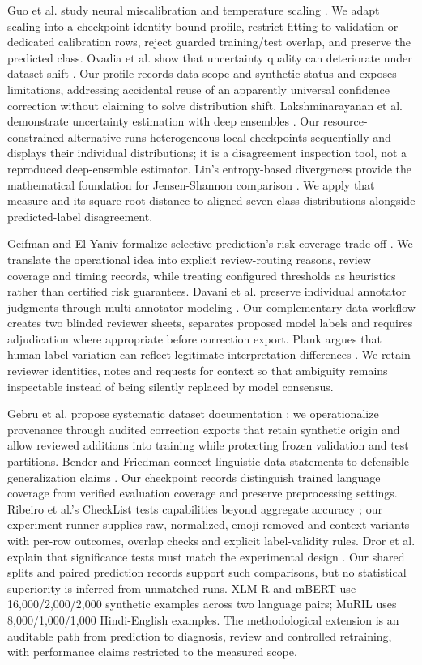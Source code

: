 \documentclass[conference]{IEEEtran}
\begin{document}
Guo et al. study neural miscalibration and temperature scaling \cite{guo2017}. We adapt scaling into a checkpoint-identity-bound profile, restrict fitting to validation or dedicated calibration rows, reject guarded training/test overlap, and preserve the predicted class. Ovadia et al. show that uncertainty quality can deteriorate under dataset shift \cite{ovadia2019}. Our profile records data scope and synthetic status and exposes limitations, addressing accidental reuse of an apparently universal confidence correction without claiming to solve distribution shift. Lakshminarayanan et al. demonstrate uncertainty estimation with deep ensembles \cite{lakshminarayanan2017}. Our resource-constrained alternative runs heterogeneous local checkpoints sequentially and displays their individual distributions; it is a disagreement inspection tool, not a reproduced deep-ensemble estimator. Lin's entropy-based divergences provide the mathematical foundation for Jensen-Shannon comparison \cite{lin1991}. We apply that measure and its square-root distance to aligned seven-class distributions alongside predicted-label disagreement.

Geifman and El-Yaniv formalize selective prediction's risk-coverage trade-off \cite{geifman2017}. We translate the operational idea into explicit review-routing reasons, review coverage and timing records, while treating configured thresholds as heuristics rather than certified risk guarantees. Davani et al. preserve individual annotator judgments through multi-annotator modeling \cite{davani2022}. Our complementary data workflow creates two blinded reviewer sheets, separates proposed model labels and requires adjudication where appropriate before correction export. Plank argues that human label variation can reflect legitimate interpretation differences \cite{plank2022}. We retain reviewer identities, notes and requests for context so that ambiguity remains inspectable instead of being silently replaced by model consensus.

Gebru et al. propose systematic dataset documentation \cite{gebru2021}; we operationalize provenance through audited correction exports that retain synthetic origin and allow reviewed additions into training while protecting frozen validation and test partitions. Bender and Friedman connect linguistic data statements to defensible generalization claims \cite{bender2018}. Our checkpoint records distinguish trained language coverage from verified evaluation coverage and preserve preprocessing settings. Ribeiro et al.'s CheckList tests capabilities beyond aggregate accuracy \cite{ribeiro2020}; our experiment runner supplies raw, normalized, emoji-removed and context variants with per-row outcomes, overlap checks and explicit label-validity rules. Dror et al. explain that significance tests must match the experimental design \cite{dror2018}. Our shared splits and paired prediction records support such comparisons, but no statistical superiority is inferred from unmatched runs. XLM-R and mBERT use 16,000/2,000/2,000 synthetic examples across two language pairs; MuRIL uses 8,000/1,000/1,000 Hindi-English examples. The methodological extension is an auditable path from prediction to diagnosis, review and controlled retraining, with performance claims restricted to the measured scope.
\end{document}
